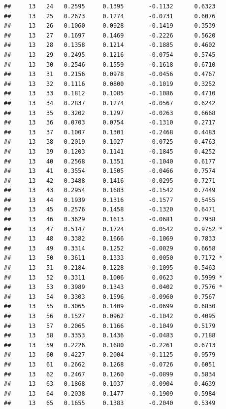 \documentclass[
]{article}
\begin{document}
\begin{verbatim}
##     13   24   0.2595     0.1395       -0.1132      0.6323  
##     13   25   0.2673     0.1274       -0.0731      0.6076  
##     13   26   0.1060     0.0928       -0.1419      0.3539  
##     13   27   0.1697     0.1469       -0.2226      0.5620  
##     13   28   0.1358     0.1214       -0.1885      0.4602  
##     13   29   0.2495     0.1216       -0.0754      0.5745  
##     13   30   0.2546     0.1559       -0.1618      0.6710  
##     13   31   0.2156     0.0978       -0.0456      0.4767  
##     13   32   0.1116     0.0800       -0.1019      0.3252  
##     13   33   0.1812     0.1085       -0.1086      0.4710  
##     13   34   0.2837     0.1274       -0.0567      0.6242  
##     13   35   0.3202     0.1297       -0.0263      0.6668  
##     13   36   0.0703     0.0754       -0.1310      0.2717  
##     13   37   0.1007     0.1301       -0.2468      0.4483  
##     13   38   0.2019     0.1027       -0.0725      0.4763  
##     13   39   0.1203     0.1141       -0.1845      0.4252  
##     13   40   0.2568     0.1351       -0.1040      0.6177  
##     13   41   0.3554     0.1505       -0.0466      0.7574  
##     13   42   0.3488     0.1416       -0.0295      0.7271  
##     13   43   0.2954     0.1683       -0.1542      0.7449  
##     13   44   0.1939     0.1316       -0.1577      0.5455  
##     13   45   0.2576     0.1458       -0.1320      0.6471  
##     13   46   0.3629     0.1613       -0.0681      0.7938  
##     13   47   0.5147     0.1724        0.0542      0.9752 *
##     13   48   0.3382     0.1666       -0.1069      0.7833  
##     13   49   0.3314     0.1252       -0.0029      0.6658  
##     13   50   0.3611     0.1333        0.0050      0.7172 *
##     13   51   0.2184     0.1228       -0.1095      0.5463  
##     13   52   0.3311     0.1006        0.0623      0.5999 *
##     13   53   0.3989     0.1343        0.0402      0.7576 *
##     13   54   0.3303     0.1596       -0.0960      0.7567  
##     13   55   0.3065     0.1409       -0.0699      0.6830  
##     13   56   0.1527     0.0962       -0.1042      0.4095  
##     13   57   0.2065     0.1166       -0.1049      0.5179  
##     13   58   0.3353     0.1436       -0.0483      0.7188  
##     13   59   0.2226     0.1680       -0.2261      0.6713  
##     13   60   0.4227     0.2004       -0.1125      0.9579  
##     13   61   0.2662     0.1268       -0.0726      0.6051  
##     13   62   0.2467     0.1260       -0.0899      0.5834  
##     13   63   0.1868     0.1037       -0.0904      0.4639  
##     13   64   0.2038     0.1477       -0.1909      0.5984  
##     13   65   0.1655     0.1383       -0.2040      0.5349  

\end{verbatim}
\end{document}
